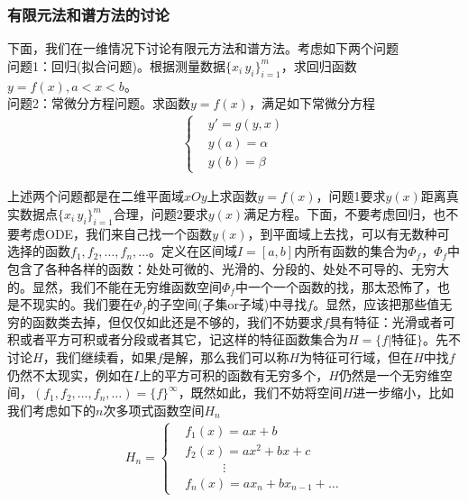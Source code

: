         \subsubsection{有限元法和谱方法的讨论}
            \label{subsubsec:有限元法和谱方法的讨论}
            \par
            下面，我们在一维情况下讨论有限元方法和谱方法。考虑如下两个问题\\
            问题1：回归(拟合问题)。根据测量数据$\{x_i\,y_i\}_{i = 1}^m$，求回归函数$y = f(x),a<x<b$。\\
            问题2：常微分方程问题。求函数$y = f(x)$，满足如下常微分方程
            \begin{align*}
            \left\{
                \begin{aligned}
                    &y' = g(y,x)\\
                    &y(a) = \alpha\\
                    &y(b) = \beta
                \end{aligned}
            \right.
            \end{align*}
            \par
            上述两个问题都是在二维平面域$xOy$上求函数$y = f(x)$，问题1要求$y(x)$距离真实数据点$\{x_i\,y_i\}_{i = 1}^m$合理，问题2要求$y(x)$满足方程。下面，不要考虑回归，也不要考虑ODE，我们来自己找一个函数$y(x)$，到平面域上去找，可以有无数种可选择的函数$f_1,f_2,\dots,f_n,\dots$。定义在区间域$I= [a,b]$内所有函数的集合为$\varPhi_f$，$\varPhi_f$中包含了各种各样的函数：处处可微的、光滑的、分段的、处处不可导的、无穷大的。显然，我们不能在无穷维函数空间$\varPhi_f$中一个一个函数的找，那太恐怖了，也是不现实的。我们要在$\varPhi_f$的子空间(子集or子域)中寻找$f$。显然，应该把那些值无穷的函数类去掉，但仅仅如此还是不够的，我们不妨要求$f$具有特征：光滑或者可积或者平方可积或者分段或者其它，记这样的特征函数集合为$H = \{f|\text{特征}\}$。先不讨论$H$，我们继续看，如果$f$是解，那么我们可以称$H$为特征可行域，但在$H$中找$f$仍然不太现实，例如在$I$上的平方可积的函数有无穷多个，$H$仍然是一个无穷维空间，$(f_1,f_2,\dots,f_n,\dots) = \{f\}^\infty$，既然如此，我们不妨将空间$H$进一步缩小，比如我们考虑如下的$n$次多项式函数空间$H_n$
            \begin{align}
                \label{n次多项式函数集}
                H_n = \left\{
                    \begin{aligned}
                        &f_1(x) = ax+b\\
                        &f_2(x) = ax^2+bx+c\\
                        &\qquad \quad \vdots \\
                        &f_n(x) = a x_n+bx_{n-1}+\dots
                    \end{aligned}
                \right.
            \end{align}
